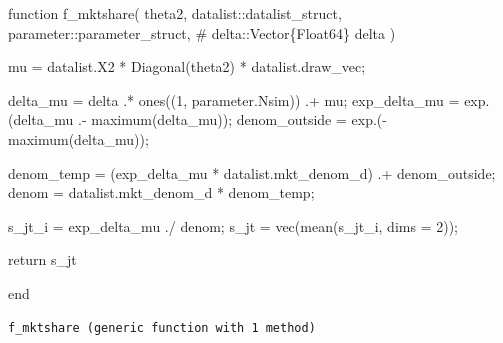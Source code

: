 \documentclass[
  letterpaper,
  DIV=11,
  numbers=noendperiod]{scrreprt}
\newenvironment{Shaded}{\begin{snugshade}}{\end{snugshade}}
\newcommand{\CharTok}[1]{\textcolor[rgb]{0.13,0.47,0.30}{#1}}
\newcommand{\CommentTok}[1]{\textcolor[rgb]{0.37,0.37,0.37}{#1}}
\newcommand{\ControlFlowTok}[1]{\textcolor[rgb]{0.00,0.23,0.31}{#1}}
\newcommand{\DataTypeTok}[1]{\textcolor[rgb]{0.68,0.00,0.00}{#1}}
\newcommand{\FloatTok}[1]{\textcolor[rgb]{0.68,0.00,0.00}{#1}}
\newcommand{\FunctionTok}[1]{\textcolor[rgb]{0.28,0.35,0.67}{#1}}
\newcommand{\KeywordTok}[1]{\textcolor[rgb]{0.00,0.23,0.31}{#1}}
\newcommand{\NormalTok}[1]{\textcolor[rgb]{0.00,0.23,0.31}{#1}}
\newcommand{\OperatorTok}[1]{\textcolor[rgb]{0.37,0.37,0.37}{#1}}
\begin{document}
\begin{Shaded}
\begin{Highlighting}[]
\KeywordTok{function} \FunctionTok{f\_mktshare}\NormalTok{(}
\NormalTok{        theta2,}
\NormalTok{        datalist}\OperatorTok{::}\DataTypeTok{datalist\_struct}\NormalTok{,}
\NormalTok{        parameter}\OperatorTok{::}\DataTypeTok{parameter\_struct}\NormalTok{,}
\CommentTok{\#         delta::Vector\{Float64\}}
\NormalTok{        delta}
\NormalTok{    )}
        
\NormalTok{    mu }\OperatorTok{=}\NormalTok{ datalist.X2 }\OperatorTok{*} \FunctionTok{Diagonal}\NormalTok{(theta2) }\OperatorTok{*}\NormalTok{ datalist.draw\_vec;}
    
\NormalTok{    delta\_mu }\OperatorTok{=}\NormalTok{ delta }\OperatorTok{.*} \FunctionTok{ones}\NormalTok{((}\FloatTok{1}\NormalTok{, parameter.Nsim)) }\OperatorTok{.+}\NormalTok{ mu;}
\NormalTok{    exp\_delta\_mu }\OperatorTok{=} \FunctionTok{exp}\NormalTok{.(delta\_mu }\OperatorTok{.{-}} \FunctionTok{maximum}\NormalTok{(delta\_mu));}
\NormalTok{    denom\_outside }\OperatorTok{=} \FunctionTok{exp}\NormalTok{.(}\FunctionTok{{-}maximum}\NormalTok{(delta\_mu));}
    
\NormalTok{    denom\_temp }\OperatorTok{=}\NormalTok{ (exp\_delta\_mu}\OperatorTok{\textquotesingle{}} \OperatorTok{*}\NormalTok{ datalist.mkt\_denom\_d)}\CharTok{\textquotesingle{} .+ denom\_outside;}
\NormalTok{    denom }\OperatorTok{=}\NormalTok{ datalist.mkt\_denom\_d }\OperatorTok{*}\NormalTok{ denom\_temp;}
    
\NormalTok{    s\_jt\_i }\OperatorTok{=}\NormalTok{ exp\_delta\_mu }\OperatorTok{./}\NormalTok{ denom;}
\NormalTok{    s\_jt }\OperatorTok{=} \FunctionTok{vec}\NormalTok{(}\FunctionTok{mean}\NormalTok{(s\_jt\_i, dims }\OperatorTok{=} \FloatTok{2}\NormalTok{));}
    
    \ControlFlowTok{return}\NormalTok{ s\_jt}
    
\KeywordTok{end}
\end{Highlighting}
\end{Shaded}

\begin{verbatim}
f_mktshare (generic function with 1 method)
\end{verbatim}
\end{document}
